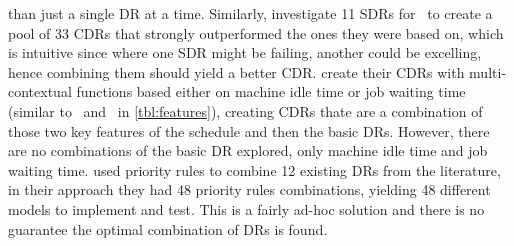 than just a single DR at a time. 
Similarly, \citet{Lu13} investigate 11 SDRs for \JSP\ to create a pool of 
33 CDRs that strongly outperformed the ones they were based on, which 
is intuitive since where one SDR might be failing, another could be excelling, 
hence combining them should yield a better CDR. \citeauthor{Lu13} create their 
CDRs with {multi-contextual functions} based either on machine idle time 
or job waiting time (similar to \phiwait\ and \phimacSlack\ in 
\cref{tbl:features}), creating CDRs thate are a combination of those 
two key features of the schedule and then the basic DRs. However, there are no 
combinations of the basic DR explored, only machine idle time and job waiting 
time.  
\citet{Yu13} used priority rules to combine 12 existing DRs from the 
literature, in their approach they had 48 priority rules combinations, 
yielding 48 different models to implement and test. This is a fairly 
ad-hoc solution and there is no guarantee the optimal combination of DRs is 
found. 

